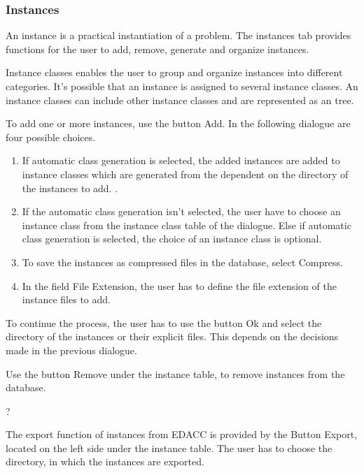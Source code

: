 \subsubsection{Instances}
 An instance is a practical instantiation of a problem. The instances tab provides functions for the user to add, remove, generate and organize instances.

 Instance classes enables the user to group and organize instances into different categories. It's possible that an instance is assigned to several instance classes. An instance classes can include other instance classes and are represented as an tree.

 To add one or more instances, use the button Add. In the following dialogue are four possible choices. 
\begin{enumerate}
	\item If automatic class generation is selected, the added instances are added to instance classes which
	are generated from the dependent on the directory of the instances to add. .
	
	\item If the automatic class generation isn't selected, the user have to choose an instance class from the 		instance class table of the dialogue. Else if automatic class generation is selected, the choice of an 			instance class is optional.
	
	\item To save the instances as compressed files in the database, select Compress.
	
	\item In the field File Extension, the user has to define the file extension of the instance files to add.
\end{enumerate}

To continue the process, the user has to use the button Ok and select the directory of the instances or their explicit files. This depends on the decisions made in the previous dialogue.
 

 Use the button Remove under the instance table, to remove instances from the database.

 ?

 The export function of instances from EDACC is provided by the Button Export, located on the left side under the instance table. The user has to choose the directory, in which the instances are exported.

